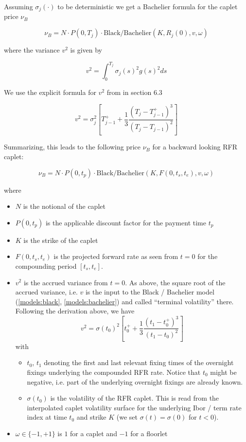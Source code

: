 Assuming $\sigma_j(\cdot)$ to be deterministic we get a Bachelier formula for the caplet price $\nu_B$

\begin{equation}
\nu_B = N \cdot P(0,T_j) \cdot \text{Black/Bachelier}( K, R_j(0), v, \omega )
\end{equation}

where the variance $v^2$ is given by

\begin{equation}
v^2 = \int_0^{T_j} \sigma_j(s)^2 g(s)^2 ds
\end{equation}

We use the explicit formula for $v^2$ from \cite{Lyashenko_Mercurio_2019} in section 6.3

\begin{equation}
v^2 = \sigma_j^2 \left[ T_{j-1}^+ + \frac{1}{3} \frac{(T_j - T_{j-1}^+)^3}{(T_j - T_{j-1})^2} \right]
\end{equation}

Summarizing, this leads to the following price $\nu_B$ for a backward looking RFR caplet:

\begin{equation}
\label{pricing:ir_capfloor_rfr_caplet}
\nu_B = N \cdot P(0,t_p) \cdot \text{Black/Bachelier}(K, F(0, t_s, t_e), v, \omega)
\end{equation}

where

\begin{itemize}
\item $N$ is the notional of the caplet
\item $P(0,t_p)$ is the applicable discount factor for the payment time $t_p$
\item $K$ is the strike of the caplet
\item $F(0,t_s,t_e)$ is the projected forward rate as seen from $t=0$ for the compounding period $[t_s, t_e]$.
\item $v^2$ is the accrued variance from $t=0$. As above, the square root of the accrued variance, i.e. $v$ is the input
  to the Black / Bachelier model (\ref{models:black}, \ref{models:bachelier}) and called ``terminal volatility''
  there. Following the derivation above, we have
\begin{equation}
v^2 = \sigma(t_0)^2 \left[ t_0^+ + \frac{1}{3} \frac{(t_1 - t_0^+)^3}{(t_1 - t_0)^2} \right]
\end{equation}
with
  \begin{itemize}
  \item $t_0$, $t_1$ denoting the first and last relevant fixing times of the overnight fixings underlying the compounded
    RFR rate. Notice that $t_0$ might be negative, i.e. part of the underlying overnight fixings are already known.
  \item $\sigma(t_0)$ is the volatility of the RFR caplet. This is read from the interpolated caplet volatility surface
    for the underlying Ibor / term rate index at time $t_0$ and strike $K$ (we set $\sigma(t) = \sigma(0)$ for $t<0$).
  \end{itemize}
\item $\omega \in \{-1,+1\}$ is $1$ for a caplet and $-1$ for a floorlet
\end{itemize}

